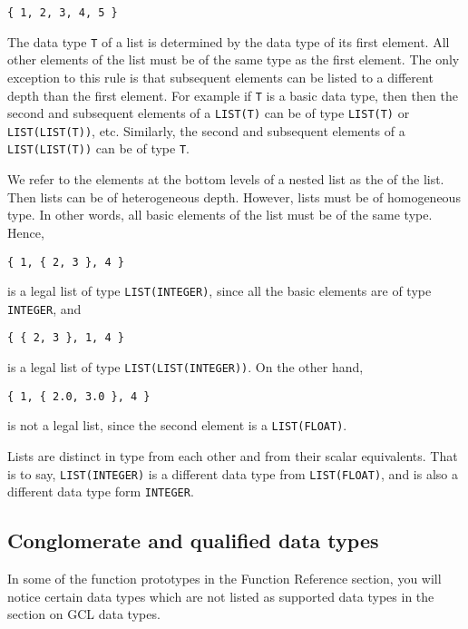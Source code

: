 \begin{verbatim}
{ 1, 2, 3, 4, 5 }
\end{verbatim}

\noindent 
The data type \verb+T+ of a list is determined by the data type of its
first element.  All other elements of the list must be of the same
type as the first element.  The only exception to this rule is that
subsequent elements can be listed to a different depth than the first
element.  For example if \verb+T+ is a basic data type, then then the
second and subsequent elements of a \verb+LIST(T)+ can be of type
\verb+LIST(T)+ or \verb+LIST(LIST(T))+, etc.  Similarly, the second
and subsequent elements of a \verb+LIST(LIST(T))+ can be of type
\verb+T+.  

We refer to the elements at the bottom levels of a nested list as the
 of the list.  Then lists can be of heterogeneous
depth.  However, lists must be of homogeneous type. In other words,
all basic elements of the list must be of the same type.  Hence,

\begin{verbatim}
{ 1, { 2, 3 }, 4 }
\end{verbatim}

\noindent 
is a legal list of type \verb+LIST(INTEGER)+, since all the basic
elements are of type {\tt INTEGER}, and 

\begin{verbatim}
{ { 2, 3 }, 1, 4 }
\end{verbatim}

\noindent 
is a legal list of type \verb+LIST(LIST(INTEGER))+.  On the other
hand, 

\begin{verbatim}
{ 1, { 2.0, 3.0 }, 4 }
\end{verbatim}

\noindent 
is not a legal list, since the second element is a {\tt LIST(FLOAT)}.

Lists are distinct in type from each other and from their scalar
equivalents.  That is to say, {\tt LIST(INTEGER)} is a different data
type from {\tt LIST(FLOAT)}, and is also a different data type form
{\tt INTEGER}.
 
\subsection{Conglomerate and qualified data types}

In some of the function prototypes in the Function Reference section,
you will notice certain data types which are not listed as supported
data types in the section on GCL data types. 

